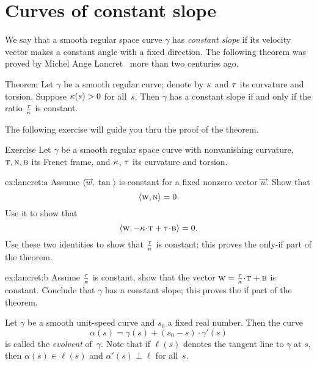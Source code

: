 \section{Curves of constant slope}

We say that a smooth regular space curve $\gamma$ has \emph{constant slope} if its velocity vector makes a constant angle with a fixed direction.
The following theorem was proved by Michel Ange Lancret~\cite{lancret} more than two centuries ago.

\begin{thm}{Theorem}\label{thm:const-slope}
Let $\gamma$ be a smooth regular curve;
denote by $\kappa$ and $\tau$ its curvature and torsion.
Suppose $\kappa(s)>0$ for all~$s$.
Then $\gamma$ has a constant slope if and only if the ratio $\tfrac{\tau}{\kappa}$ is constant.
\end{thm}

The following exercise will guide you thru the proof of the theorem. 

\begin{thm}{Exercise} \label{ex:lancret}
Let $\gamma$ be a smooth regular space curve with nonvanishing curvature, $\text{\sc{t}},\text{\sc{n}},\text{\sc{b}}$ 
its Frenet frame, and $\kappa$, $\tau$ its curvature and torsion.


\begin{subthm}{ex:lancret:a}
Assume $\langle \vec w,\tan\rangle$ is constant for a fixed nonzero vector $\vec w$.
Show that 
\[\langle \text{\sc{w}}, \text{\sc{n}}\rangle =0.\]
Use it to show that 
\[\langle \vec w, -\kur\cdot\tan+\tor\cdot \bi\rangle =0.\]
Use these two identities to show that $\tfrac{\tau}{\kappa}$ is constant;
this proves the only-if part of the theorem.
\end{subthm}

\begin{subthm}{ex:lancret:b} Assume $\tfrac{\tau}{\kappa}$ is constant, show that the vector $\vec w=\tfrac\tor\kur\cdot \tan+\bi$ is constant.
Conclude that $\gamma$ has a constant slope; this proves the if part of the theorem.
\end{subthm}

\end{thm}

Let $\gamma$ be a smooth unit-speed curve and $s_0$ a fixed real number. 
Then the curve 
\[\alpha(s)=\gamma(s)+(s_0-s)\cdot \gamma'(s)\]
is called the \emph{evolvent} of~$\gamma$.
Note that if $\ell(s)$ denotes the tangent line to $\gamma$ at $s$,
then $\alpha(s)\in \ell(s)$ and $\alpha'(s)\perp \ell$ for all~$s$.

